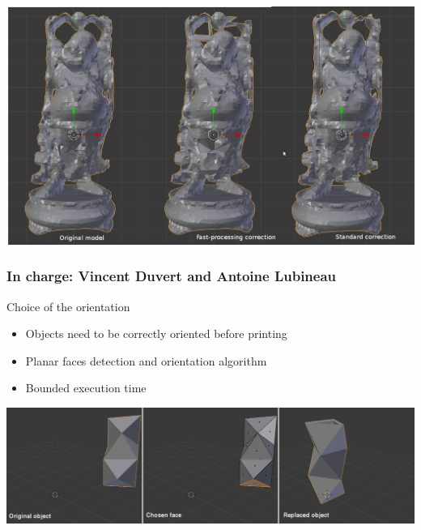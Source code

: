 \documentclass{beamer}
\begin{document}
\begin{frame}

    \includegraphics[width=1\textwidth]{damages}

\end{frame}

\begin{frame}
    \frametitle{In charge: Vincent Duvert and Antoine Lubineau} 
	\begin{block}{Choice of the orientation}
		\begin{itemize}
			\item Objects need to be correctly oriented before printing
			\item Planar faces detection and orientation algorithm
			\item Bounded execution time
		\end{itemize}
    \end{block}

	\begin{center}
		\includegraphics[width=\textwidth]{pf_detect}
	\end{center}
\end{frame}
\end{document}
